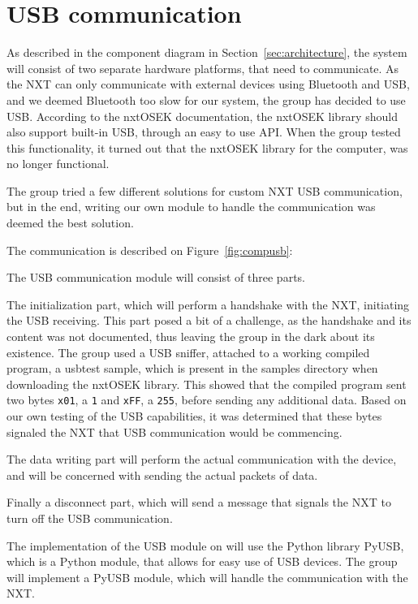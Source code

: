 \section{USB communication}
\label{sec:usbdes}
As described in the component diagram in Section~\ref{sec:architecture}, the system will consist of two separate hardware platforms, that need to communicate.
As the NXT can only communicate with external devices using Bluetooth and USB, and we deemed Bluetooth too slow for our system, the group has decided to use USB.
According to the nxtOSEK documentation, the nxtOSEK library should also support built-in USB, through an easy to use API\cite{ecrobotUSB}.
When the group tested this functionality, it turned out that the nxtOSEK library for the computer, was no longer functional.

The group tried a few different solutions for custom NXT USB communication, but in the end, writing our own module to handle the communication was deemed the best solution.

The communication is described on Figure~\ref{fig:compusb}:


The USB communication module will consist of three parts.

The initialization part, which will perform a handshake with the NXT, initiating the USB receiving.
This part posed a bit of a challenge, as the handshake and its content was not documented, thus leaving the group in the dark about its existence.
The group used a USB sniffer, attached to a working compiled program, a usbtest sample, which is present in the samples directory when downloading the nxtOSEK library\cite{ecrobotUSB}.
This showed that the compiled program sent two bytes \texttt{x01}, a \texttt{1} and \texttt{xFF}, a \texttt{255}, before sending any additional data.
Based on our own testing of the USB capabilities, it was determined that these bytes signaled the NXT that USB communication would be commencing.

The data writing part will perform the actual communication with the device, and will be concerned with sending the actual packets of data.

Finally a disconnect part, which will send a message that signals the NXT to turn off the USB communication.

The implementation of the USB module on will use the Python library PyUSB, which is a Python module, that allows for easy use of USB devices\cite{PyUSB}.
The group will implement a PyUSB module, which will handle the communication with the NXT.


